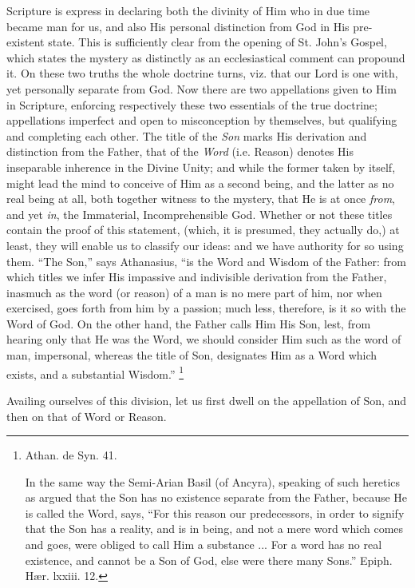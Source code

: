 Scripture is express in declaring both the divinity of Him who in
due time became man for us, and also His personal distinction from God
in His pre-existent state. This is sufficiently clear from the opening
of St. John's Gospel, which states the mystery as distinctly as an
ecclesiastical comment can propound it. On these two truths the whole
doctrine turns, viz. that our Lord is one with, yet personally
separate from God. Now there are two appellations given to Him in
Scripture, enforcing respectively these two essentials of the true
doctrine; appellations imperfect and open to misconception by
themselves, but qualifying and completing each other. The title of the
\emph{Son} marks His derivation and distinction from the Father,
that of the \emph{Word} (i.e. Reason) denotes His inseparable
inherence in the Divine Unity; and while the former taken by itself,
might lead the mind to conceive of Him as a second being, and the
latter as no real being at all, both together witness to the mystery,
that He is at once \emph{from}, and yet \emph{in}, the Immaterial,
Incomprehensible God. Whether or not these titles contain the proof of
this statement, (which, it is presumed, they actually do,) at least,
they will enable us to classify our ideas: and we have authority for
so using them. ``The Son,'' says Athanasius, ``is the Word
and Wisdom of the Father: from which titles we infer His impassive and
indivisible derivation from the Father, inasmuch as the word (or
reason) of a man is no mere part of him, nor when exercised, goes
forth from him by a passion; much less, therefore, is it so with the
Word of God. On the other hand, the Father calls Him His Son, lest,
from hearing only that He was the Word, we should consider Him such as
the word of man, impersonal, whereas the title of Son, designates Him
as a Word which exists, and a substantial Wisdom.'' \footnote{Athan. de Syn. 41.

In the same way the Semi-Arian Basil (of Ancyra), speaking of such
heretics as argued that the Son has no existence separate from the
Father, because He is called the Word, says, ``For this reason our
predecessors, in order to signify that the Son has a reality, and is
in being, and not a mere word which comes and goes, were obliged to
call Him a substance ... For a word has no real existence, and cannot
be a Son of God, else were there many Sons.'' Epiph. Hær. lxxiii.
12.}

Availing ourselves of this division, let us first dwell on the
appellation of Son, and then on that of Word or Reason.

